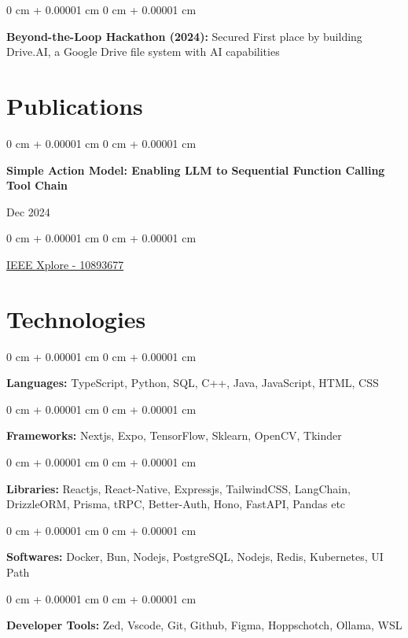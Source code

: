 \documentclass[10pt, letterpaper]{article}
\newenvironment{onecolentry}{
    \begin{adjustwidth}{
        0 cm + 0.00001 cm
    }{
        0 cm + 0.00001 cm
    }
}{
    \end{adjustwidth}
} %
\newenvironment{twocolentry}[2][]{
    \onecolentry
    \def\secondColumn{#2}
    \setcolumnwidth{\fill, 4.5 cm}
    \begin{paracol}{2}
}{
    \switchcolumn \raggedleft \secondColumn
    \end{paracol}
    \endonecolentry
} %
\begin{document}
\vspace{0.2 cm}

\begin{onecolentry}
	\textbf{Beyond-the-Loop Hackathon (2024):} Secured First place by building Drive.AI, a Google Drive file system with AI capabilities
\end{onecolentry}

\section{Publications}

\begin{samepage}
	\begin{twocolentry}{
			Dec 2024
		}
		\textbf{Simple Action Model: Enabling LLM to Sequential Function Calling Tool Chain}
	\end{twocolentry}

	\vspace{0.10 cm}

	\begin{onecolentry}

		\vspace{0.10 cm}

		\href{https://ieeexplore.ieee.org/document/10893677}{IEEE Xplore - 10893677}
	\end{onecolentry}
\end{samepage}

\section{Technologies}

\begin{onecolentry}
	\textbf{Languages:} TypeScript, Python, SQL, C++, Java, JavaScript, HTML, CSS
\end{onecolentry}

\vspace{0.2 cm}

\begin{onecolentry}
	\textbf{Frameworks:} Nextjs, Expo, TensorFlow, Sklearn, OpenCV, Tkinder
\end{onecolentry}
\vspace{0.2 cm}

\begin{onecolentry}
	\textbf{Libraries:} Reactjs, React-Native, Expressjs, TailwindCSS, LangChain, DrizzleORM, Prisma, tRPC, Better-Auth, Hono, FastAPI, Pandas etc
\end{onecolentry}
\vspace{0.2 cm}

\begin{onecolentry}
	\textbf{Softwares:} Docker, Bun, Nodejs, PostgreSQL, Nodejs, Redis, Kubernetes, UI Path %
\end{onecolentry}
\vspace{0.2 cm}

\begin{onecolentry}
	\textbf{Developer Tools:} Zed, Vscode, Git, Github, Figma, Hoppschotch, Ollama, WSL
\end{onecolentry}
\end{document}
